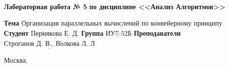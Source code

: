 \vspace{1cm}

\begin{center}
	\noindent\begin{minipage}{1.3\textwidth}\centering
		\Large\textbf{  Лабораторная работа № 5}\newline
		\textbf{по дисциплине <<Анализ Алгоритмов>>}\newline\newline
	\end{minipage}
\end{center}

\noindent\textbf{Тема} $\underline{\text{Организация параллельных вычислений по конвейерному принципу}}$\newline\newline
\noindent\textbf{Студент} $\underline{\text{Пермякова Е. Д.}}$\newline\newline
\noindent\textbf{Группа} $\underline{\text{ИУ7-52Б}}$\newline\newline
\noindent\textbf{Преподаватели} $\underline{\text{Строганов Д. В., Волкова Л. Л}}$\newline

\begin{center}
	\vfill
	Москва,~\the\year
\end{center}
\clearpage

